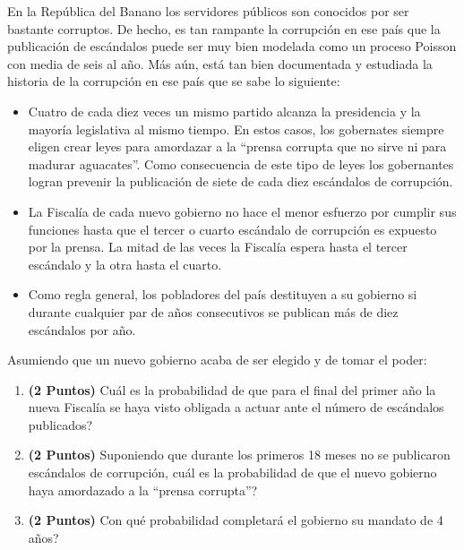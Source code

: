 \documentclass[ a4paper, twoside, 11pt]{article}
\begin{document}
\begin{problem}
En la Rep\'ublica del Banano los servidores p\'ublicos son conocidos por ser bastante corruptos. De hecho, es tan rampante la corrupci\'on en ese pa\'is que la publicaci\'on de esc\'andalos puede ser muy bien modelada como un proceso Poisson con media de seis al a\~no. M\'as a\'un, est\'a tan bien documentada y estudiada la historia de la corrupci\'on en ese pa\'is que se sabe lo siguiente: 
\begin{itemize}
\item Cuatro de cada diez veces un mismo partido alcanza la presidencia y la mayor\'ia legislativa al mismo tiempo. En estos casos, los gobernates siempre eligen crear leyes para amordazar a la ``prensa corrupta que no sirve ni para madurar aguacates''. Como consecuencia de este tipo de leyes los gobernantes logran prevenir la publicaci\'on de siete de cada diez esc\'andalos de corrupci\'on. 
\item La Fiscal\'ia de cada nuevo gobierno no hace el menor esfuerzo por cumplir sus funciones hasta que el tercer o cuarto esc\'andalo de corrupci\'on es expuesto por la prensa. La mitad de las veces la Fiscal\'ia espera hasta el tercer esc\'andalo y la otra hasta el cuarto. 
\item Como regla general, los pobladores del pa\'is destituyen a su gobierno si durante cualquier par de a\~nos consecutivos se publican m\'as de diez esc\'andalos por a\~no.
\end{itemize}

Asumiendo que un nuevo gobierno acaba de ser elegido y de tomar el poder: 
\begin{enumerate}[label=\alph*)]
\item \textbf{(2 Puntos)} Cu\'al es la probabilidad de que para el final del primer a\~no la nueva Fiscal\'ia se haya visto obligada a actuar ante el n\'umero de esc\'andalos publicados?
\item \textbf{(2 Puntos)} Suponiendo que durante los primeros 18 meses no se publicaron esc\'andalos de corrupci\'on, cu\'al es la probabilidad de que el nuevo gobierno haya amordazado a la ``prensa corrupta''?
\item \textbf{(2 Puntos)} Con qu\'e probabilidad completar\'a el gobierno su mandato de 4 a\~nos?
\end{enumerate}

\end{problem}
\vspace{\baselineskip}
\end{document}
